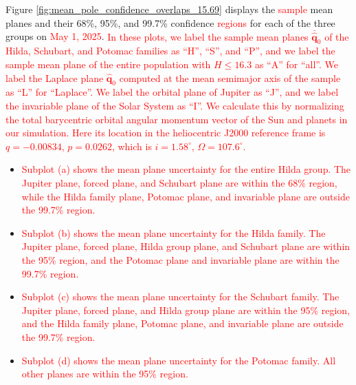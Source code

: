 \documentclass[a4paper,fleqn]{cas-sc}
\begin{document}
\begin{linenumbers}
Figure \ref{fig:mean_pole_confidence_overlaps_15.69} displays the \textcolor{red}{sample} mean planes and their 68\%, 95\%, and 99.7\% confidence \textcolor{red}{regions} for each of the three groups on \textcolor{red}{May 1, 2025}.
\textcolor{red}{
In these plots, we label the sample mean planes $\bar{\hat{\mathbf{q}}}_0$ of the Hilda, Schubart, and Potomac families as ``H'', ``S'', and ``P'', and we label the sample mean plane of the entire population with $H\leq16.3$ as ``A'' for ``all''.
We label the Laplace plane $\hat{\mathbf{q}}_0$ computed at the mean semimajor axis of the sample as ``L'' for ``Laplace''.
We label the orbital plane of Jupiter as ``J'', and we label the invariable plane of the Solar System as ``I''.
We calculate this by normalizing the total barycentric orbital angular momentum vector of the Sun and planets in our simulation. Here its location in the heliocentric J2000 reference frame is $q=-0.00834$, $p=0.0262$, which is $i=1.58^\circ$, $\Omega=107.6^\circ$.
}
\begin{itemize}
\item \textcolor{red}{
Subplot (a) shows the mean plane uncertainty for the entire Hilda group.
The Jupiter plane, forced plane, and Schubart plane are within the 68\% region, while the Hilda family plane, Potomac plane, and invariable plane are outside the 99.7\% region.
}
\item \textcolor{red}{
Subplot (b) shows the mean plane uncertainty for the Hilda family.
The Jupiter plane, forced plane, Hilda group plane, and Schubart plane are within the 95\% region, and the Potomac plane and invariable plane are within the 99.7\% region.
}
\item \textcolor{red}{
Subplot (c) shows the mean plane uncertainty for the Schubart family.
The Jupiter plane, forced plane, and Hilda group plane are within the 95\% region, and the Hilda family plane, Potomac plane, and invariable plane are outside the 99.7\% region.
}
\item \textcolor{red}{
Subplot (d) shows the mean plane uncertainty for the Potomac family.
All other planes are within the 95\% region.
}
\end{itemize}


\end{linenumbers}
\end{document}
